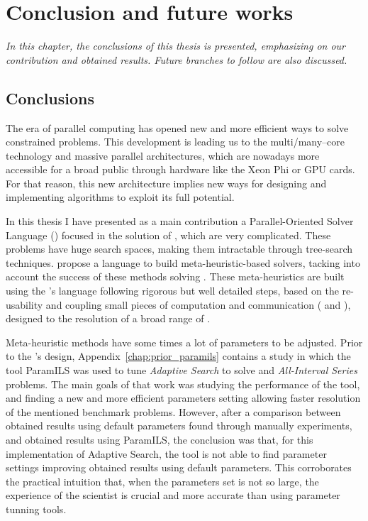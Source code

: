 \chapter{Conclusion and future works}
\label{chap:conclusion}
\textit{In this chapter, the conclusions of this thesis is presented, emphasizing on our contribution and obtained results. Future branches to follow are also discussed.}
\vfill
\minitoc
\newpage

\section{Conclusions}
\label{sec:conclusion_conclusion}

The era of parallel computing has opened new and more efficient ways to solve constrained problems. This development is leading us to the multi/many--core technology and massive parallel architectures, which are nowadays more accessible for a broad public through hardware like the Xeon Phi or GPU cards. For that reason, this new architecture implies new ways for designing and implementing algorithms to exploit its full potential.

In this thesis I have presented as a main contribution a Parallel-Oriented Solver Language (\posl) focused in the solution of \CSPs, which are very complicated. These problems have huge search spaces, making them intractable through tree-search techniques. \posl{} propose a language to build meta-heuristic-based solvers, tacking into account the success of these methods solving \csps{}. These meta-heuristics are built using the \posl's language following rigorous but well detailed steps, based on the re-usability and coupling small pieces of computation and communication (\oms{} and \opchs), designed to the resolution of a broad range of \csps. 

Meta-heuristic methods have some times a lot of parameters to be adjusted. Prior to the \posl{}'s design, Appendix~\ref{chap:prior_paramils} contains a study in which the tool {\sc ParamILS} was used to tune {\it Adaptive Search} to solve \carr{} and {\it All-Interval Series} problems. The main goals of that work was studying the performance of the tool, and finding a new and more efficient parameters setting allowing faster resolution of the mentioned benchmark problems. However, after a comparison between obtained results using default parameters found through manually experiments, and obtained results using {\sc ParamILS}, the conclusion was that, for this implementation of Adaptive Search, the tool is not able to find parameter settings improving obtained results using default parameters. This corroborates the practical intuition that, when the parameters set is not so large, the experience of the scientist is crucial and more accurate than using parameter tunning tools.

